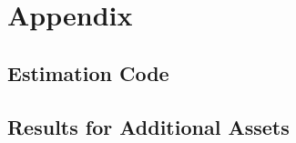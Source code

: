\section{Appendix}
    \subsection{Estimation Code}
        \begin{small}
            
        \end{small}
        

    \subsection{Results for Additional Assets}